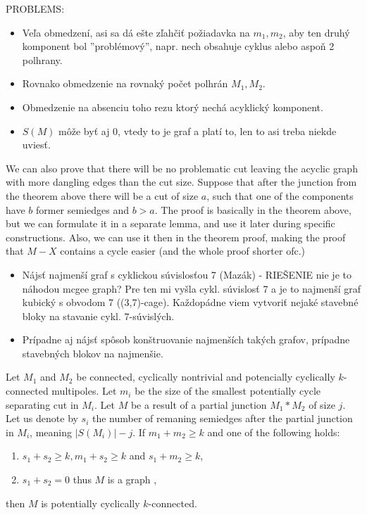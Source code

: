 \documentclass[12pt, twoside]{book}
\begin{document}
PROBLEMS:

\begin{itemize}
	\item Veľa obmedzení, asi sa dá ešte zľahčiť požiadavka na $m_1,m_2$, aby ten druhý komponent bol ''problémový'', napr. nech obsahuje cyklus alebo aspoň 2 polhrany.
	\item Rovnako obmedzenie na rovnaký počet polhrán $M_1,M_2$.
	\item Obmedzenie na absenciu toho rezu ktorý nechá acyklický komponent.
	\item $S(M)$ môže byť aj 0, vtedy to je graf a platí to, len to asi treba niekde uviesť.
\end{itemize}

\todo{}We can also prove that there will be no problematic cut leaving the acyclic graph with more dangling edges than the cut size. Suppose that after the junction from the theorem above there will be a cut of size $a$, such that one of the components have $b$ former semiedges and $b>a$. The proof is basically in the theorem above, but we can formulate it in a separate lemma, and use it later during specific constructions. Also, we can use it then in the theorem proof, making the proof that $M-X$ contains a cycle easier (and the whole proof shorter ofc.)

\begin{itemize}
	\item Nájsť najmenší graf s cyklickou súvislosťou 7 (Mazák) - RIEŠENIE nie je to náhodou mcgee graph? Pre ten mi vyšla cykl. súvislosť 7 a je to najmenší graf kubický s obvodom 7 ((3,7)-cage). Každopádne viem vytvoriť nejaké stavebné bloky na stavanie cykl. 7-súvislých.
	\item Prípadne aj nájsť spôsob konštruovanie najmenších takých grafov, prípadne stavebných blokov na najmenšie.
\end{itemize}

\begin{theorem}\label{th:connecting-potencially-cyclically-connected-with-number-of-resulting-semiedges}
	Let $M_1$ and $M_2$ be connected, cyclically nontrivial and potencially cyclically $k$-connected multipoles. Let $m_i$ be the size of the smallest potentially cycle separating cut in $M_i$. Let $M$ be a result of a partial junction $M_1*M_2$ of size $j$. Let us denote by $s_i$ the number of remaning semiedges after the partial junction in $M_i$, meaning $|S(M_i)|-j$. If $m_1+m_2\geq k$ and one of the following holds:
	
	\begin{enumerate}
		\item $s_1+s_2\geq k, m_1+s_2\geq k$ and $s_1+m_2\geq k$,
		\item $s_1+s_2=0$ thus $M$ is a graph ,
	\end{enumerate}

	then $M$ is potentially cyclically $k$-connected.
\end{theorem}
\end{document}
